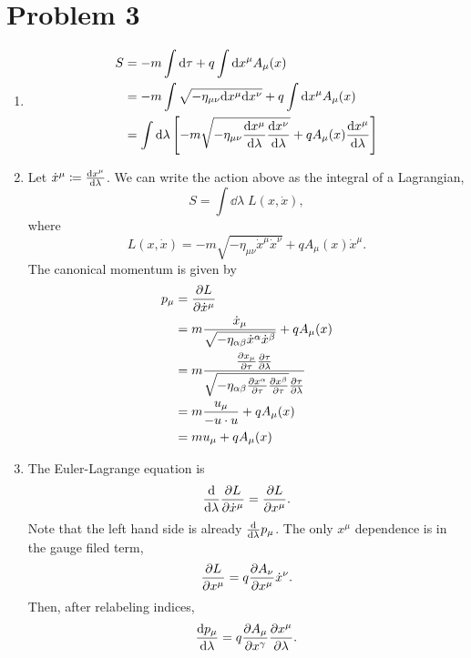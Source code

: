\documentclass[12pt]{article}
\begin{document}
\section*{Problem 3}
\begin{enumerate}[label=(\alph*)]
    \item
    \begin{align*}
        S &= -m\int\dd\tau + q\int\dd x^\mu A_\mu(x) \\
        &= -m\int\sqrt{-\eta_{\mu\nu}\dd x^\mu \dd x^\nu} + q\int\dd x^\mu A_\mu(x) \\
        &= \int\dd\lambda \left[ -m\sqrt{-\eta_{\mu\nu}\dv{x^\mu}{\lambda}\dv{x^\nu}{\lambda}} + qA_\mu(x)\dv{x^\mu}{\lambda} \right]
    \end{align*}

    \item Let $\dot{x}^\mu \coloneqq \dv{x^\mu}{\lambda}$. We can write the action above as the integral of a Lagrangian,
    \[ S = \int\dd\lambda\; L(x, \dot{x}), \]
    where
    \[ L(x, \dot{x}) = -m\sqrt{-\eta_{\mu\nu}\dot{x}^\mu\dot{x}^\nu} + qA_\mu(x)\dot{x}^\mu.\]
    The canonical momentum is given by
    \begin{align*}
        p_\mu &= \pdv{L}{\dot{x}^\mu} \\
        &= m\frac{\dot{x}_\mu}{\sqrt{-\eta_{\alpha\beta}\dot{x}^\alpha\dot{x}^\beta}} + qA_\mu(x) \\
        &= m\frac{\pdv{x_\mu}{\tau}\pdv{\tau}{\lambda}}{\sqrt{-\eta_{\alpha\beta}\pdv{x^\alpha}{\tau}\pdv{x^\beta}{\tau}}\pdv{\tau}{\lambda}} \\
        &= m\frac{u_\mu}{-u\cdot u} + qA_\mu(x) \\
        &= mu_\mu + qA_\mu(x)
    \end{align*}

    \item The Euler-Lagrange equation is
    \[ \dv{\lambda}\pdv{L}{\dot{x}^\mu} = \pdv{L}{x^\mu}. \]
    Note that the left hand side is already $\dv{\lambda} p_\mu$. The only $x^\mu$ dependence is in the gauge filed term,
    \[ \pdv{L}{x^\mu} = q\pdv{A_\nu}{x^\mu}\dot{x}^\nu. \]
    Then, after relabeling indices,
    \[ \dv{p_\mu}{\lambda} = q\pdv{A_\mu}{x^\gamma}\pdv{x^\mu}{\lambda}. \]


\end{enumerate}
\end{document}
